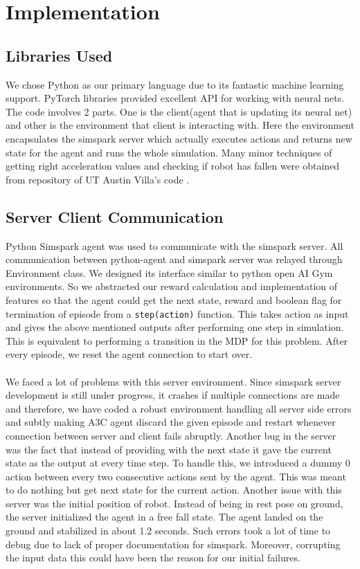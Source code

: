 \chapter{Implementation}

\section{Libraries Used}
We chose Python as our primary language due to its fantastic machine learning support. PyTorch libraries provided excellent API for working with neural nets. The code involves 2 parts. One is the client(agent that is updating its neural net) and other is the environment that client is interacting with. Here the environment encapsulates the simspark server which actually executes actions and returns new state for the agent and runs the whole simulation. Many minor techniques of getting right acceleration values and checking if robot has fallen were obtained from repository of UT Austin Villa's code \cite{utaustin}. 

\section{Server Client Communication} 
Python Simspark agent \cite{pysimspark} was used to communicate with the simspark server. All communication between python-agent and simspark server was relayed through Environment class. We designed its interface similar to python open AI Gym environments. So we abstracted our reward calculation and implementation of features so that the agent could get the next state, reward and boolean flag for termination of episode from  a \texttt{step(action)} function. This takes action as input and gives the above mentioned outputs after performing one step in simulation. This is equivalent to performing a transition in the MDP \cite{Sutton:1998:IRL:551283} for this problem. After every episode, we reset the agent connection to start over. 
\\\\
We faced a lot of problems with this server environment. Since simspark server development is still under progress, it crashes if multiple connections are made and therefore, we have coded a robust environment handling all server side errors and subtly making A3C agent discard the given episode and restart whenever connection between server and client fails abruptly. Another bug in the server was the fact that instead of providing with the next state it gave the current state as the output at every time step. To handle this, we introduced a dummy 0 action between every two consecutive actions sent by the agent. This was meant to do nothing but get next state for the current action. Another issue with this server was the initial position of robot. Instead of being in rest pose on ground, the server initialized the agent in a free fall state. The agent landed on the ground and stabilized in about 1.2 seconds. Such errors took a lot of time to debug due to lack of proper documentation for simspark. Moreover, corrupting the input data this could have been the reason for our initial failures. 

